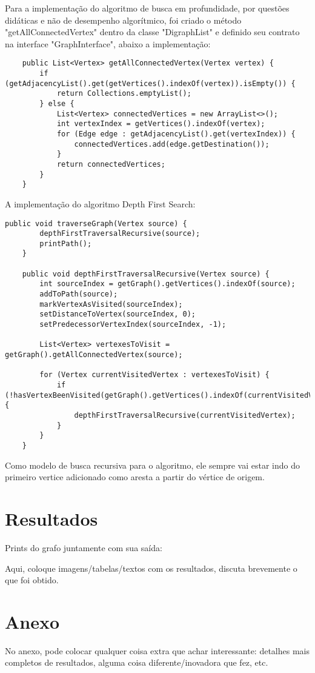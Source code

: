 \documentclass[a4paper, 12pt]{article}
\begin{document}
Para a implementação do algoritmo de busca em profundidade, por questões didáticas e não de desempenho algorítmico, foi criado o método "getAllConnectedVertex" dentro da classe "DigraphList" e definido seu contrato na interface "GraphInterface", abaixo a implementação:

\begin{verbatim}
    public List<Vertex> getAllConnectedVertex(Vertex vertex) {
        if (getAdjacencyList().get(getVertices().indexOf(vertex)).isEmpty()) {
            return Collections.emptyList();
        } else {
            List<Vertex> connectedVertices = new ArrayList<>();
            int vertexIndex = getVertices().indexOf(vertex);
            for (Edge edge : getAdjacencyList().get(vertexIndex)) {
                connectedVertices.add(edge.getDestination());
            }
            return connectedVertices;
        }
    }
\end{verbatim}

A implementação do algoritmo Depth First Search: 

\begin{verbatim}
public void traverseGraph(Vertex source) {
        depthFirstTraversalRecursive(source);
        printPath();
    }

    public void depthFirstTraversalRecursive(Vertex source) {
        int sourceIndex = getGraph().getVertices().indexOf(source);
        addToPath(source);
        markVertexAsVisited(sourceIndex);
        setDistanceToVertex(sourceIndex, 0);
        setPredecessorVertexIndex(sourceIndex, -1);

        List<Vertex> vertexesToVisit = getGraph().getAllConnectedVertex(source);

        for (Vertex currentVisitedVertex : vertexesToVisit) {
            if (!hasVertexBeenVisited(getGraph().getVertices().indexOf(currentVisitedVertex))) {
                depthFirstTraversalRecursive(currentVisitedVertex);
            }
        }
    }
\end{verbatim}

Como modelo de busca recursiva para o algoritmo, ele sempre vai estar indo do primeiro vertice adicionado como aresta a partir do vértice de origem.

\newpage
\section{Resultados}
Prints do grafo juntamente com sua saída:


Aqui, coloque imagens/tabelas/textos com os resultados, discuta brevemente o que foi obtido.
\newpage


\newpage
{}
\section*{Anexo}
No anexo, pode colocar qualquer coisa extra que achar interessante: detalhes mais completos de resultados, alguma coisa diferente/inovadora que fez, etc.
\end{document}
